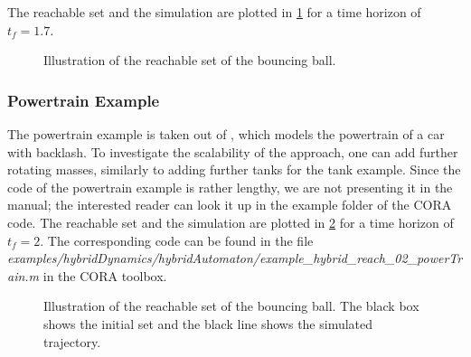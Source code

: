The reachable set and the simulation are plotted in \cref{fig:bouncingBallResult} for a time horizon of $t_f = 1.7$.

\begin{figure}[htb]
  \centering	
  	\footnotesize
    \caption{Illustration of the reachable set of the bouncing ball.}
    \label{fig:bouncingBallResult}		
\end{figure}


\subsubsection{Powertrain Example}

The powertrain example is taken out of \cite[Sec.~6]{Althoff2012a}, which models the powertrain of a car with backlash. To investigate the scalability of the approach, one can add further rotating masses, similarly to adding further tanks for the tank example. Since the code of the powertrain example is rather lengthy, we are not presenting it in the manual; the interested reader can look it up in the example folder of the CORA code. The reachable set and the simulation are plotted in \cref{fig:example_hybrid_reach_02_powerTrain} for a time horizon of $t_f = 2$. The corresponding code can be found in the file \textit{examples/hybridDynamics/hybridAutomaton/}\textit{example\_hybrid\_reach\_02\_powerTrain.m} in the CORA toolbox.

\begin{figure}[htb]
  \centering	
  	\footnotesize
    \caption{Illustration of the reachable set of the bouncing ball. The black box shows the initial set and the black line shows the simulated trajectory.}
    \label{fig:example_hybrid_reach_02_powerTrain}		
\end{figure}
